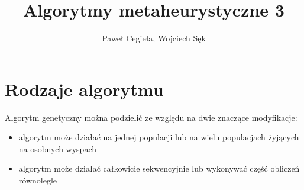 \documentclass{article}
\title{Algorytmy metaheurystyczne 3}
\author{Paweł Cegieła, Wojciech Sęk}
\begin{document}
 

\maketitle

\section{Rodzaje algorytmu}
Algorytm genetyczny można podzielić ze względu na dwie znaczące modyfikacje:
\begin{itemize}
\item algorytm może działać na jednej populacji lub na wielu populacjach żyjących na osobnych wyspach
\item algorytm może działać całkowicie sekwencyjnie lub wykonywać część obliczeń równolegle
\end{itemize}
\end{document}
